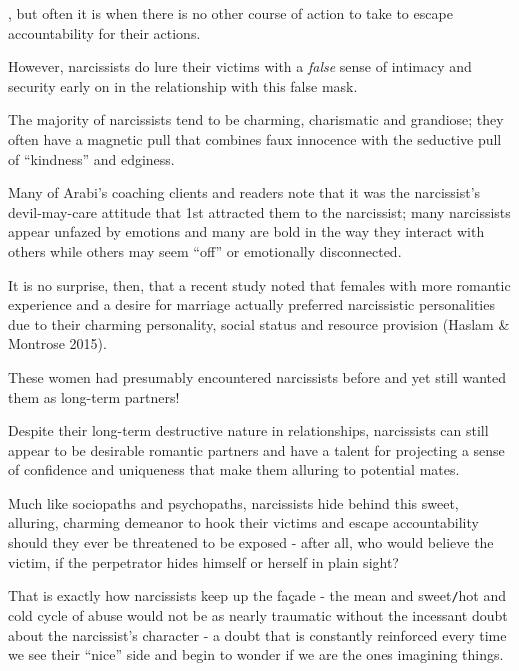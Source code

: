 \documentclass[oneside]{book}
\numberwithin{equation}{section}
\begin{document}
, but often it is when there is no other course of action to take to escape accountability for their actions.

%
However, narcissists do lure their victims with a \textit{false} sense of intimacy and security early on in the relationship with this false mask.

The majority of narcissists tend to be charming, charismatic and grandiose; they often have a magnetic pull that combines faux innocence with the seductive pull of ``kindness'' and edginess.

Many of Arabi's coaching clients and readers note that it was the narcissist's devil-may-care attitude that 1st attracted them to the narcissist; many narcissists appear unfazed by emotions and many are bold in the way they interact with others while others may seem ``off'' or emotionally disconnected.

%
It is no surprise, then, that a recent study noted that females with more romantic experience and a desire for marriage actually preferred narcissistic personalities due to their charming personality, social status and resource provision (Haslam \& Montrose 2015).

These women had presumably encountered narcissists before and yet still wanted them as long-term partners!

Despite their long-term destructive nature in relationships, narcissists can still appear to be desirable romantic partners and have a talent for projecting a sense of confidence and uniqueness that make them alluring to potential mates.

%


Much like sociopaths and psychopaths, narcissists hide behind this sweet, alluring, charming demeanor to hook their victims and escape accountability should they ever be threatened to be exposed - after all, who would believe the victim, if the perpetrator hides himself or herself in plain sight?

%
That is exactly how narcissists keep up the fa\c{c}ade - the mean and sweet\texttt{/}hot and cold cycle of abuse would not be as nearly traumatic without the incessant doubt about the narcissist's character - a doubt that is constantly reinforced every time we see their ``nice'' side and begin to wonder if we are the ones imagining things.
\end{document}
